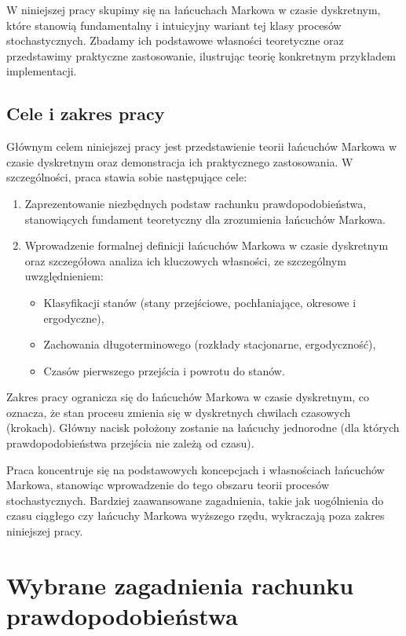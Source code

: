 \documentclass[final,a4paper,openany,12pt]{mwbk}
\begin{document}
W niniejszej pracy skupimy się na łańcuchach Markowa w czasie dyskretnym, które stanowią fundamentalny i intuicyjny wariant tej klasy procesów stochastycznych. Zbadamy ich podstawowe własności teoretyczne oraz przedstawimy praktyczne zastosowanie, ilustrując teorię konkretnym przykładem implementacji.

\section{Cele i zakres pracy}

Głównym celem niniejszej pracy jest przedstawienie teorii łańcuchów Markowa w czasie dyskretnym oraz demonstracja ich praktycznego zastosowania. W szczególności, praca stawia sobie następujące cele:

\begin{enumerate}
    \item Zaprezentowanie niezbędnych podstaw rachunku prawdopodobieństwa, stanowiących fundament teoretyczny dla zrozumienia łańcuchów Markowa.
    
    \item Wprowadzenie formalnej definicji łańcuchów Markowa w czasie dyskretnym oraz szczegółowa analiza ich kluczowych własności, ze szczególnym uwzględnieniem:
    \begin{itemize}
        \item Klasyfikacji stanów (stany przejściowe, pochłaniające, okresowe i ergodyczne),
        \item Zachowania długoterminowego (rozkłady stacjonarne, ergodyczność),
        \item Czasów pierwszego przejścia i powrotu do stanów.
    \end{itemize}
    
\end{enumerate}

Zakres pracy ogranicza się do łańcuchów Markowa w czasie dyskretnym, co oznacza, że stan procesu zmienia się w dyskretnych chwilach czasowych (krokach). Główny nacisk położony zostanie na łańcuchy jednorodne (dla których prawdopodobieństwa przejścia nie zależą od czasu).

Praca koncentruje się na podstawowych koncepcjach i własnościach łańcuchów Markowa, stanowiąc wprowadzenie do tego obszaru teorii procesów stochastycznych. Bardziej zaawansowane zagadnienia, takie jak uogólnienia do czasu ciągłego czy łańcuchy Markowa wyższego rzędu, wykraczają poza zakres niniejszej pracy.

\chapter{Wybrane zagadnienia rachunku prawdopodobieństwa}
\end{document}
